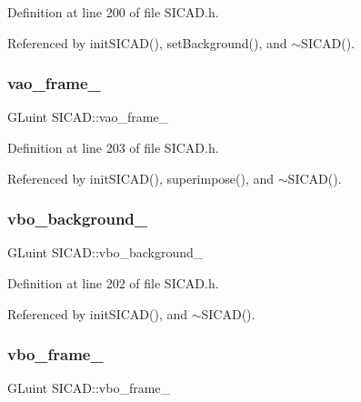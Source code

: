 Definition at line 200 of file S\+I\+C\+A\+D.\+h.



Referenced by init\+S\+I\+C\+A\+D(), set\+Background(), and $\sim$\+S\+I\+C\+A\+D().

\mbox{\label{classSICAD_ae91abeb0fe30f27e0fc40649235f3437}} 
\subsubsection{\texorpdfstring{vao\+\_\+frame\+\_\+}{vao\_frame\_}}
{\footnotesize\ttfamily G\+Luint S\+I\+C\+A\+D\+::vao\+\_\+frame\+\_\+\hspace{0.3cm}{\ttfamily [private]}}



Definition at line 203 of file S\+I\+C\+A\+D.\+h.



Referenced by init\+S\+I\+C\+A\+D(), superimpose(), and $\sim$\+S\+I\+C\+A\+D().

\mbox{\label{classSICAD_a86d6184b8c557460317a158e8d9508d1}} 
\subsubsection{\texorpdfstring{vbo\+\_\+background\+\_\+}{vbo\_background\_}}
{\footnotesize\ttfamily G\+Luint S\+I\+C\+A\+D\+::vbo\+\_\+background\+\_\+\hspace{0.3cm}{\ttfamily [private]}}



Definition at line 202 of file S\+I\+C\+A\+D.\+h.



Referenced by init\+S\+I\+C\+A\+D(), and $\sim$\+S\+I\+C\+A\+D().

\mbox{\label{classSICAD_af58ffe3edf622ab96f669fcd6e210be9}} 
\subsubsection{\texorpdfstring{vbo\+\_\+frame\+\_\+}{vbo\_frame\_}}
{\footnotesize\ttfamily G\+Luint S\+I\+C\+A\+D\+::vbo\+\_\+frame\+\_\+\hspace{0.3cm}{\ttfamily [private]}}



